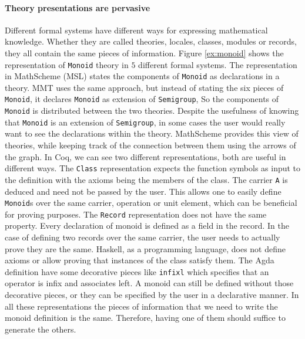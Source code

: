\paragraph{Theory presentations are pervasive} Different formal systems have different ways 
for expressing mathematical knowledge. Whether they are called theories, locales, classes, 
modules or records, they all contain the same pieces of information. Figure \ref{ex:monoid} shows 
the representation of \verb|Monoid| theory in $5$ different formal systems. The representation in 
MathScheme (MSL) states the components of \verb|Monoid| as declarations in a theory. 
MMT uses the same approach, but instead of stating the six pieces of \verb|Monoid|, it declares 
\verb|Monoid| as extension of \verb|Semigroup|, So the components of \verb|Monoid| is distributed 
between the two theories. Despite the usefulness of knowing that \verb|Monoid| is an extension of 
\verb|Semigroup|, in some cases the user would really want to see the declarations within the 
theory. MathScheme provides this view of theories, while keeping track of the connection between 
them using the arrows of the graph. 
In Coq, we can see two different representations, both are useful in different ways. The 
\verb|Class| representation expects the function symbols as input to the definition with the axioms 
being the members of the class. The carrier \verb|A| is deduced and need not be passed by the 
user. This allows one to easily define \verb|Monoid|s over the same carrier, operation or unit element, 
which can be beneficial for proving purposes. The \verb|Record| representation does not have the 
same property. Every declaration of monoid is defined as a field in the record. In the case of 
defining two records over the same carrier, the user needs to actually prove they are the same. 
Haskell, as a programming language, does not define axioms or allow proving that instances of the 
class satisfy them. 
The Agda definition have some decorative pieces like \verb|infixl| which specifies that an 
operator is infix and associates left. A monoid can still be defined without those decorative pieces, 
or they can be specified by the user in a declarative manner. 
In all these representations the pieces of information that we need to write the monoid definition is 
the same. Therefore, having one of them should suffice to generate the others. 

